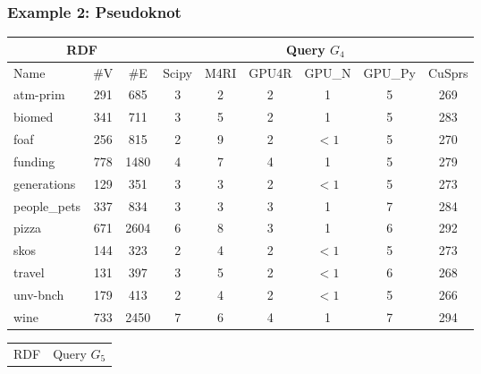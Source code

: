 \documentclass[xcolor=table]{beamer}
\newcommand{\ltz}{$< 1$}
\begin{document}
\begin{frame}[fragile] \frametitle{Example 2: Pseudoknot}
\begin{center}
  {\tiny
  \begin{tabular}{| p{1.25cm} | c | c | c | c | c | c | c | c | }
      \hline
      \multicolumn{3}{|c|}{RDF}        & \multicolumn{6}{|c|}{Query $G_4$}  \\
      \hline
      Name                                & \#V & \#E  & Scipy & M4RI  & GPU4R & GPU\_N & GPU\_Py & CuSprs \\
      \hline
      \hline
      \tiny{atm-prim}                    & 291 & 685  & 3     &  2    & 2     & 1      & 5       & 269  \\
      \tiny{biomed}                      & 341 & 711  & 3     &  5    & 2     & 1      & 5       & 283  \\
      \tiny{foaf}                        & 256 & 815  & 2     &  9    & 2     & \ltz   & 5       & 270  \\
      \tiny{funding}                     & 778 & 1480 & 4     &  7    & 4     & 1      & 5       & 279  \\
      \tiny{generations}                 & 129 & 351  & 3     &  3    & 2     & \ltz   & 5       & 273  \\
      \tiny{people\_pets}                & 337 & 834  & 3     &  3    & 3     & 1      & 7       & 284  \\
      \tiny{pizza}                       & 671 & 2604 & 6     &  8    & 3     & 1      & 6       & 292  \\
      \tiny{skos}                        & 144 & 323  & 2     &  4    & 2     & \ltz   & 5       & 273  \\
      \tiny{travel}                      & 131 & 397  & 3     &  5    & 2     & \ltz   & 6       & 268  \\
      \tiny{unv-bnch}                    & 179 & 413  & 2     &  4    & 2     & \ltz   & 5       & 266  \\
      \tiny{wine}                        & 733 & 2450 & 7     &  6    & 4     & 1      & 7       & 294  \\
      \hline
    \end{tabular}
    }
    {\tiny
      \begin{tabular}{| p{1.25cm} | c | c | c | c | c | c | c | c | }
          \hline
          \multicolumn{3}{|c|}{RDF}        & \multicolumn{6}{|c|}{Query $G_5$}                              \\

\end{tabular}}
\end{center}
\end{frame}
\end{document}
